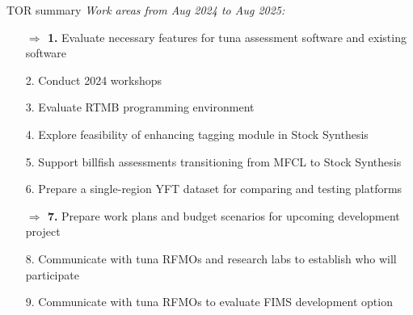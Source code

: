 \documentclass[aspectratio=169,fleqn]{beamer}
\begin{document}
\begin{frame}{TOR summary}
  \textit{\darkgray\small Work areas from Aug 2024 to Aug 2025:}\\[1ex]
  \begin{enumerate}
    \item[\bf\orange $\Rightarrow$ 1.] Evaluate necessary {\darkgreen features}
    for tuna assessment software and existing {\darkgreen software}\\[1ex]
    \item[2.] Conduct 2024 {\darkgreen workshops}\\[1ex]
    \item[3.] Evaluate {\darkgreen RTMB} programming environment\\[1ex]
    \item[4.] Explore feasibility of enhancing {\darkgreen tagging module} in
    Stock Synthesis\\[1ex]
    \item[5.] Support {\darkgreen billfish assessments} transitioning from MFCL
    to Stock Synthesis\\[1ex]
    \item[6.] Prepare a {\darkgreen single-region YFT} dataset for comparing and
    testing platforms\\[1ex]
    \item[\bf\orange $\Rightarrow$ 7.] Prepare work plans and budget scenarios
    for {\darkgreen upcoming development project}\\[1ex]
    \item[8.] Communicate with tuna RFMOs and research labs to establish
    {\darkgreen who will participate}\\[1ex]
    \item[9.] Communicate with tuna RFMOs to evaluate {\darkgreen FIMS
      development option}\\[3ex]
  \end{enumerate}
\end{frame}


\end{document}
